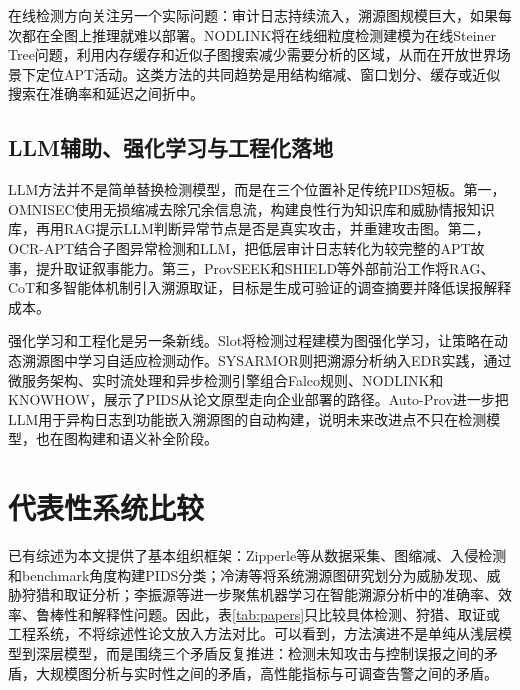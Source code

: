 在线检测方向关注另一个实际问题：审计日志持续流入，溯源图规模巨大，如果每次都在全图上推理就难以部署。NODLINK将在线细粒度检测建模为在线Steiner Tree问题，利用内存缓存和近似子图搜索减少需要分析的区域，从而在开放世界场景下定位APT活动\citep{nodlink2024}。这类方法的共同趋势是用结构缩减、窗口划分、缓存或近似搜索在准确率和延迟之间折中。

\subsection{LLM辅助、强化学习与工程化落地}

LLM方法并不是简单替换检测模型，而是在三个位置补足传统PIDS短板。第一，OMNISEC使用无损缩减去除冗余信息流，构建良性行为知识库和威胁情报知识库，再用RAG提示LLM判断异常节点是否是真实攻击，并重建攻击图\citep{omniseq2025}。第二，OCR-APT结合子图异常检测和LLM，把低层审计日志转化为较完整的APT故事，提升取证叙事能力\citep{ocrapt2025}。第三，ProvSEEK和SHIELD等外部前沿工作将RAG、CoT和多智能体机制引入溯源取证，目标是生成可验证的调查摘要并降低误报解释成本\citep{provseek2025,shield2025}。

强化学习和工程化是另一条新线。Slot将检测过程建模为图强化学习，让策略在动态溯源图中学习自适应检测动作\citep{slot2025}。SYSARMOR则把溯源分析纳入EDR实践，通过微服务架构、实时流处理和异步检测引擎组合Falco规则、NODLINK和KNOWHOW，展示了PIDS从论文原型走向企业部署的路径\citep{sysarmor2026}。Auto-Prov进一步把LLM用于异构日志到功能嵌入溯源图的自动构建，说明未来改进点不只在检测模型，也在图构建和语义补全阶段\citep{autoprov2026}。

\section{代表性系统比较}

已有综述为本文提供了基本组织框架：Zipperle等从数据采集、图缩减、入侵检测和benchmark角度构建PIDS分类\citep{zipperle2023survey}；冷涛等将系统溯源图研究划分为威胁发现、威胁狩猎和取证分析\citep{leng2022review}；李振源等进一步聚焦机器学习在智能溯源分析中的准确率、效率、鲁棒性和解释性问题\citep{li2025intelligent}。因此，表\ref{tab:papers}只比较具体检测、狩猎、取证或工程系统，不将综述性论文放入方法对比。可以看到，方法演进不是单纯从浅层模型到深层模型，而是围绕三个矛盾反复推进：检测未知攻击与控制误报之间的矛盾，大规模图分析与实时性之间的矛盾，高性能指标与可调查告警之间的矛盾。

